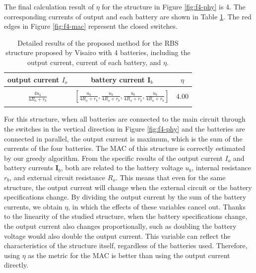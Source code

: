 \documentclass{article}
\begin{document}
The final calculation result of $\eta$ for the structure in Figure \ref{fig:f4-phy} is 4.
The corresponding currents of output and each battery are shown in Table \ref{tab:1}.
The red edges in Figure \ref{fig:f4-mac} represent the closed switches.
\begin{table}[h]
    \caption{Detailed results of the proposed method for the RBS structure proposed by Visairo\cite{visairoReconfigurableBatteryPack2008} with 4 batteries, including the output current, current of each battery, and $\eta$.}
    \label{tab:1}
    \begin{tabular}{ccc}
        \hline
        output current $I_o$       & battery current $\bm{I}_b$       & $\eta$        \\
        \hline\\
        $\displaystyle\frac{4u_b}{4R_o + r_b}$ &  $\displaystyle\left[\frac{u_b}{4R_o + r_b},\frac{u_b}{4R_o + r_b},\frac{u_b}{4R_o + r_b},\frac{u_b}{4R_o + r_b}\right]$   & $4.00$ \\
        \\
        \hline
    \end{tabular}
\end{table}
For this structure, when all batteries are connected to the main circuit through the switches in the vertical direction in Figure \ref{fig:f4-phy} and the batteries are connected in parallel, the output current is maximum, which is the sum of the currents of the four batteries.
The MAC of this structure is correctly estimated by our greedy algorithm.
From the specific results of the output current $I_o$ and battery currents $\bm{I}_b$, both are related to the battery voltage $u_b$, internal resistance $r_b$, and external circuit resistance $R_o$.
This means that even for the same structure, the output current will change when the external circuit  or the battery specifications  change.
By dividing the output current by the sum of the battery currents, we obtain $\eta$, in which the effects of these variables cancel out.
Thanks to the linearity of the studied structure, when the battery specifications change, the output current also changes proportionally, such as doubling the battery voltage would also double the output current.
This variable can reflect the characteristics of the structure itself, regardless of the batteries used.
Therefore, using $\eta$ as the metric for the MAC is better than using the output current directly.
\end{document}
